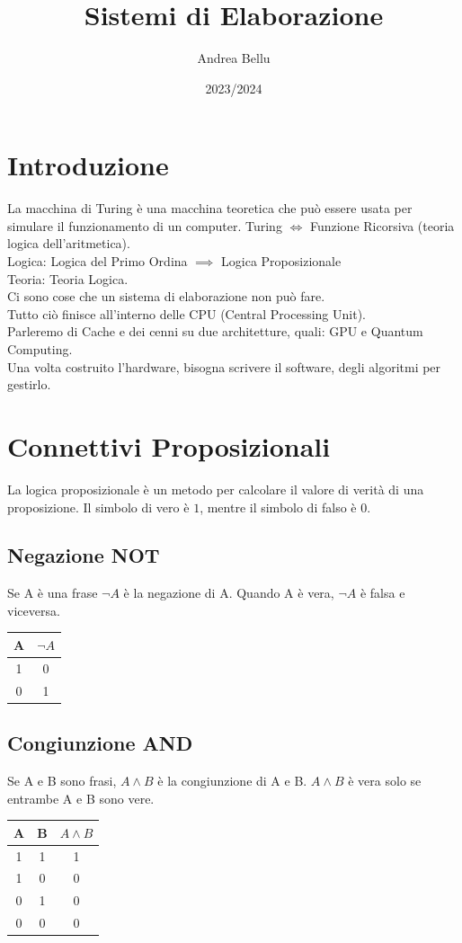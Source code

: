 \documentclass{article}
\title{Sistemi di Elaborazione}
\author{Andrea Bellu}
\date{2023/2024}
\begin{document}
\maketitle

\tableofcontents
\newpage

\section{Introduzione}
La macchina di Turing è una macchina teoretica che può essere usata per simulare il funzionamento di un computer. Turing $\iff$ Funzione Ricorsiva (teoria logica dell'aritmetica).\\
Logica: Logica del Primo Ordina $\implies$ Logica Proposizionale\\
Teoria: Teoria Logica.\\
Ci sono cose che un sistema di elaborazione non può fare.\\
Tutto ciò finisce all'interno delle CPU (Central Processing Unit).\\
Parleremo di Cache e dei cenni su due architetture, quali: GPU e Quantum Computing.\\
Una volta costruito l'hardware, bisogna scrivere il software, degli algoritmi per gestirlo.

\section{Connettivi Proposizionali}
La logica proposizionale è un metodo per calcolare il valore di verità di una proposizione. Il simbolo di vero è $1$, mentre il simbolo di falso è $0$.

\subsection{Negazione NOT}
Se A è una frase $\neg A$ è la negazione di A. Quando A è vera, $\neg A$ è falsa e viceversa.
\begin{center}
    \begin{tabular}{|c|c|}
        \hline
        A & $\neg A$ \\
        \hline
        1 & 0 \\
        0 & 1 \\
        \hline
    \end{tabular}
\end{center}
\subsection{Congiunzione AND}
Se A e B sono frasi, $A \land B$ è la congiunzione di A e B. $A \land B$ è vera solo se entrambe A e B sono vere.
\begin{center}
    \begin{tabular}{|c|c|c|}
        \hline
        A & B & $A \land B$ \\
        \hline
        1 & 1 & 1 \\
        1 & 0 & 0 \\
        0 & 1 & 0 \\
        0 & 0 & 0 \\
        \hline
    \end{tabular}
\end{center}
\end{document}
